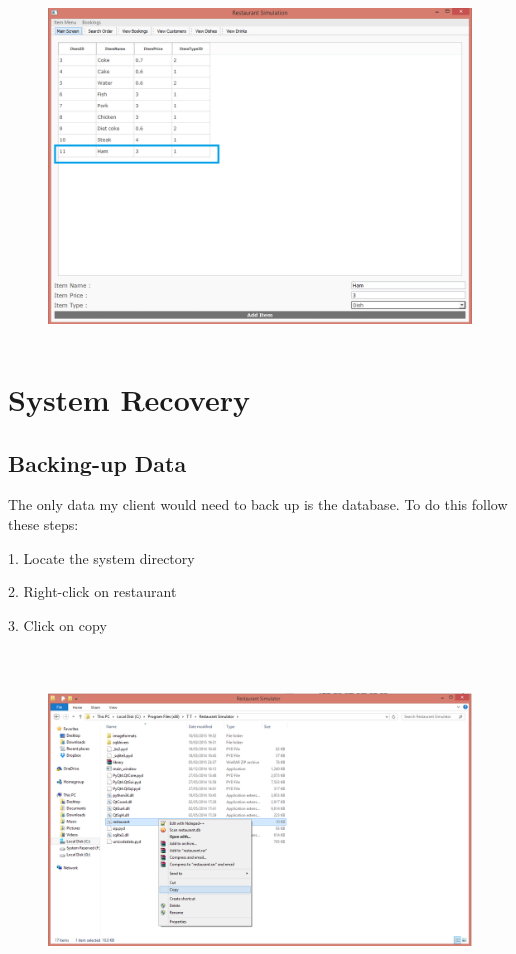 \begin{figure}[H]
    \includegraphics[height = 9cm]{./Manual/images/HamError3} 
    \caption{} \label{fig:hamerror3}
\end{figure}



\section{System Recovery}

\subsection{Backing-up Data}
The only data my client would need to back up is the database. To do this follow these steps:

1. Locate the system directory

2. Right-click on restaurant

3. Click on copy
\begin{figure}[H]
    \includegraphics[height = 9cm]{./Manual/images/backup} 
    \caption{} \label{fig:backup}
\end{figure}

